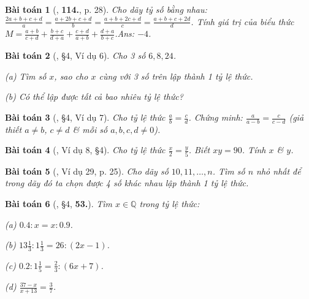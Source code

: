 \documentclass{article}
\numberwithin{equation}{section}
\newtheorem{baitoan}{Bài toán}
\begin{document}
\begin{baitoan}[\cite{Tuyen_Toan_7}, \textbf{114.}, p. 28]
	Cho dãy tỷ số bằng nhau: $\frac{2a + b + c + d}{a} = \frac{a + 2b + c + d}{b} = \frac{a + b + 2c + d}{c} = \frac{a + b + c + 2d}{d}$. Tính giá trị của biểu thức $M = \frac{a + b}{c + d} + \frac{b + c}{d + a} + \frac{c + d}{a + b} + \frac{d + a}{b + c}$.\hfill{\sf Ans:} $-4$.
\end{baitoan}

\begin{baitoan}[\cite{Binh_Toan_7_tap_1}, \S4, Ví dụ 6]
	Cho 3 số $6,8,24$.
	\begin{enumerate*}
		\item[(a)] Tìm số $x$, sao cho $x$ cùng với 3 số trên lập thành 1 tỷ lệ thức.
		\item[(b)] Có thể lập được tất cả bao nhiêu tỷ lệ thức?
	\end{enumerate*}
\end{baitoan}

\begin{baitoan}[\cite{Binh_Toan_7_tap_1}, \S4, Ví dụ 7]
	Cho tỷ lệ thức $\frac{a}{b} = \frac{c}{d}$. Chứng minh: $\frac{a}{a - b} = \frac{c}{c - d}$ (giả thiết $a\ne b$, $c\ne d$ \& mỗi số $a,b,c,d\ne 0$).
\end{baitoan}

\begin{baitoan}[\cite{Binh_Toan_7_tap_1}, Ví dụ 8, \S4]
	Cho tỷ lệ thức $\frac{x}{2} = \frac{y}{5}$. Biết $xy = 90$. Tính $x$ \& $y$.
\end{baitoan}

\begin{baitoan}[\cite{Binh_Toan_7_tap_1}, Ví dụ 29, p. 25]
	Cho dãy số $10,11,\ldots,n$. Tìm số $n$ nhỏ nhất để trong dãy đó ta chọn được 4 số khác nhau lập thành 1 tỷ lệ thức.
\end{baitoan}

\begin{baitoan}[\cite{Binh_Toan_7_tap_1}, \S4, \textbf{53.}]
	Tìm $x\in\mathbb{Q}$ trong tỷ lệ thức:
	\begin{enumerate*}
		\item[(a)] $0.4:x = x:0.9$.
		\item[(b)] $13\frac{1}{3}:1\frac{1}{3} = 26:(2x - 1)$.
		\item[(c)] $0.2:1\frac{1}{5} = \frac{2}{3}:(6x + 7)$.
		\item[(d)] $\frac{37 - x}{x + 13} = \frac{3}{7}$.
	\end{enumerate*}
\end{baitoan}
\end{document}
